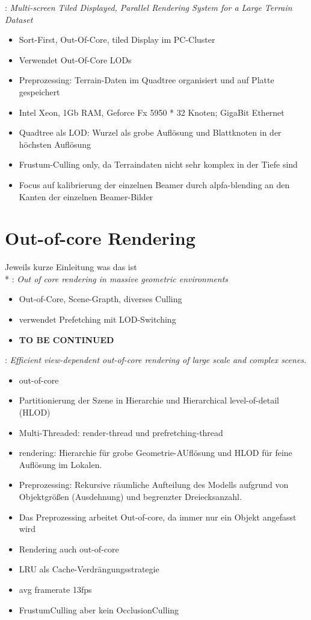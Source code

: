 \cite{DBLP:journals/ijvr/YinJSZ06}: \textit{Multi-screen Tiled Displayed, Parallel Rendering System for a Large Terrain Dataset}
\begin{itemize}
 \item Sort-First, Out-Of-Core, tiled Display im PC-Cluster
 \item Verwendet Out-Of-Core LODs
 \item Preprozessing: Terrain-Daten im Quadtree organisiert und auf Platte gespeichert
 \item Intel Xeon, 1Gb RAM, Geforce Fx 5950 * 32 Knoten; GigaBit Ethernet
 \item Quadtree als LOD: Wurzel als grobe Auflösung und Blattknoten in der höchsten Auflösung
 \item Frustum-Culling only, da Terraindaten nicht sehr komplex in der Tiefe sind
 \item Focus auf kalibrierung der einzelnen Beamer durch alpfa-blending an den Kanten der einzelnen Beamer-Bilder
\end{itemize}

\section{Out-of-core Rendering}
Jeweils kurze Einleitung was das ist\\*
\cite{manocha}: \textit{Out of core rendering in massive geometric environments}
\begin{itemize}
 \item Out-of-Core, Scene-Grapth, diverses Culling
 \item verwendet Prefetching mit LOD-Switching
 \item \textbf{TO BE CONTINUED}
\end{itemize}

\cite{gao}: \textit{Efficient view-dependent out-of-core rendering of large scale and complex scenes.}
\begin{itemize}
 \item out-of-core
 \item Partitionierung der Szene in Hierarchie und Hierarchical level-of-detail (HLOD)
 \item Multi-Threaded: render-thread und prefretching-thread
 \item rendering: Hierarchie für grobe Geometrie-AUflösung und HLOD für feine Auflösung im Lokalen.
 \item Preprozessing: Rekursive räumliche Aufteilung des Modells aufgrund von Objektgrößen (Ausdehnung) und begrenzter Dreiecksanzahl.
 \item Das Preprozessing arbeitet Out-of-core, da immer nur ein Objekt angefasst wird
 \item Rendering auch out-of-core
 \item LRU als Cache-Verdrängungsstrategie
 \item avg framerate 13fps
 \item FrustumCulling aber kein OcclusionCulling
\end{itemize}

